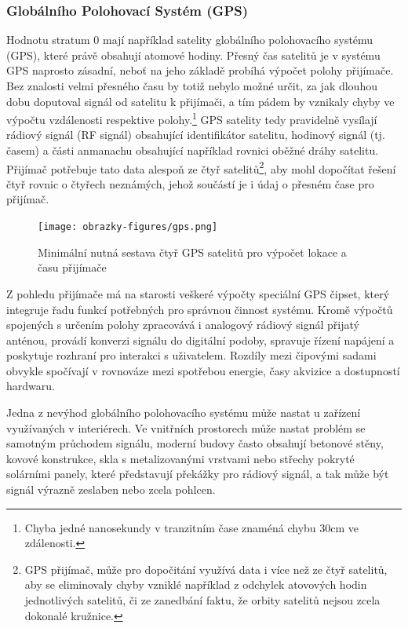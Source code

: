 \subsubsection{Globálního Polohovací Systém (GPS)}
Hodnotu stratum 0 mají například satelity globálního polohovacího systému (GPS), které právě obsahují atomové hodiny. Přesný čas satelitů je v systému GPS naprosto zásadní, neboť na jeho základě probíhá výpočet polohy přijímače. Bez znalosti velmi přesného času by totiž nebylo možné určit, za jak dlouhou dobu doputoval signál od satelitu k přijímači, a tím pádem by vznikaly chyby ve výpočtu vzdálenosti respektive polohy.\footnote{Chyba jedné nanosekundy v tranzitním čase znaméná chybu 30cm ve zdálenosti.} GPS satelity tedy pravidelně vysílají rádiový signál (RF signál) obsahující identifikátor satelitu, hodinový signál (tj. časem) a části anmanachu obsahující například rovnici oběžné dráhy satelitu. Přijímač potřebuje tato data alespoň ze čtyř satelitů\footnote{GPS přijímač, může pro dopočitání využívá data i více než ze čtyř satelitů, aby se eliminovaly chyby vzniklé například z odchylek atovových hodin jednotlivých satelitů, či ze zanedbání faktu, že orbity satelitů nejsou zcela dokonalé kružnice.}, aby mohl dopočítat řešení čtyř rovnic o čtyřech neznámých, jehož součástí je i údaj o přesném čase pro přijímač. \cite{sparkfun_gps, time_theory_gps}

\begin{figure}[h]
    \centering
    \texttt{[image: obrazky-figures/gps.png]}
    
    \caption{Minimální nutná sestava čtyř GPS satelitů pro výpočet lokace a času přijímače \cite{time_theory_gps}}
    \label{fig:low-power-modes}
\end{figure}

Z pohledu přijímače má na starosti veškeré výpočty speciální GPS čipset, který integruje řadu funkcí potřebných pro správnou činnost systému. Kromě výpočtů spojených s určením polohy zpracovává i analogový rádiový signál přijatý anténou, provádí konverzi signálu do digitální podoby, spravuje řízení napájení a poskytuje rozhraní pro interakci s uživatelem. Rozdíly mezi čipovými sadami obvykle spočívají v rovnováze mezi spotřebou energie, časy akvizice a dostupností hardwaru. \cite{sparkfun_gps}

Jedna z nevýhod globálního polohovacího systému může nastat u zařízení využívaných v interiérech. Ve vnitřních prostorech může nastat problém se samotným průchodem signálu, moderní budovy často obsahují betonové stěny, kovové konstrukce, skla s metalizovanými vrstvami nebo střechy pokryté solárními panely, které představují překážky pro rádiový signál, a tak může být signál výrazně zeslaben nebo zcela pohlcen.

